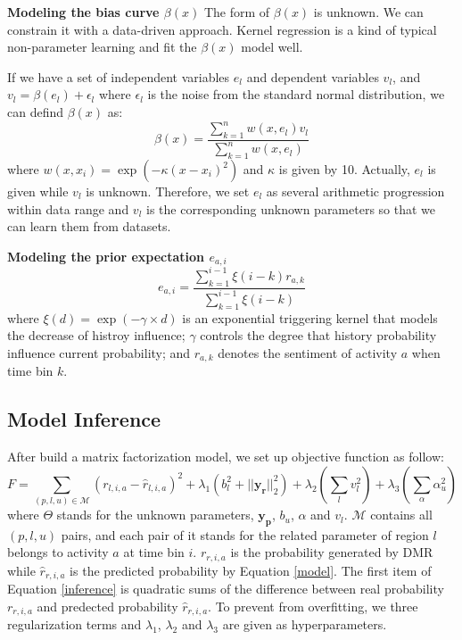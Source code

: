 \documentclass[runningheads]{llncs}
\begin{document}
\textbf{Modeling the bias curve $\beta(x)$}
The form of $\beta(x)$ is unknown.
We can constrain it with a data-driven approach.
Kernel regression is a kind of typical non-parameter learning and fit the $\beta(x)$ model well.

If we have a set of independent variables $e_l$ and dependent variables $v_l$, and $v_l=\beta(e_l)+\epsilon_l$ where $\epsilon_l$ is the noise from the standard normal distribution, we can defind $\beta(x)$ as:
$$\beta(x) = \frac{\sum_{k=1}^{n}w(x,e_l)v_l}{\sum_{k=1}^{n}w(x,e_l)}$$
where $w(x, x_i) = \exp(-\kappa(x-x_i)^2)$ and $\kappa$ is given by 10.
Actually, $e_l$ is given while $v_l$ is unknown.
Therefore, we set $e_l$ as several arithmetic progression within data range and $v_l$ is the corresponding unknown parameters so that we can learn them from datasets.

\textbf{Modeling the prior expectation $e_{a,i}$}
$$e_{a,i} = \frac{\sum_{k=1}^{i-1}\xi(i-k) r_{a,k}}{\sum_{k=1}^{i-1}\xi(i-k)}$$
where $\xi(d)=\exp(-\gamma\times d)$ is an exponential triggering kernel that models the decrease of histroy influence;
$\gamma$ controls the degree that history probability influence current probability;
and $r_{a,k}$ denotes the sentiment of activity $a$ when time bin $k$.


\subsection{Model Inference}
After build a matrix factorization model, we set up objective function as follow:
\begin{equation}
F=\sum\limits_{(p,l,u)\in\mathcal{M}}(r_{l,i,a}-\hat{r}_{l,i,a})^2+\lambda_1(b_l^2+||{\bm{y_r}}||_2^2)+\lambda_2(\sum\limits_{l}v_l^2)+\lambda_3(\sum\limits_{\alpha}\alpha_u^2)
\label{inference}
\end{equation}
where $\Theta$ stands for the unknown parameters, $\bm{y_p}$, $b_u$, $\alpha$ and $v_l$.
$\mathcal{M}$ contains all $(p,l,u)$ pairs, and each pair of it stands for the related parameter of region $l$ belongs to activity $a$ at time bin $i$.
$r_{r,i,a}$ is the probability generated by DMR while $\hat{r}_{r,i,a}$ is the predicted probability by Equation \ref{model}.
The first item of Equation \ref{inference} is quadratic sums of the difference between real probability $r_{r,i,a}$ and predected probability $\hat{r}_{r,i,a}$.
To prevent from overfitting, we three regularization terms and $\lambda_1$, $\lambda_2$ and $\lambda_3$ are given as hyperparameters.
\end{document}
